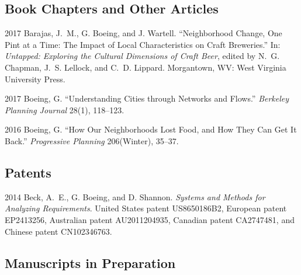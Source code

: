 \documentclass{mycv}
\begin{document}
\subsection*{Book Chapters and Other Articles}

\begin{tablist}

\item[2017] \tab Barajas, J.~M., G. Boeing, and J. Wartell. \enquote{Neighborhood Change, One Pint at a Time: The Impact of Local Characteristics on Craft Breweries.} In: \emph{Untapped: Exploring the Cultural Dimensions of Craft Beer}, edited by N.~G. Chapman, J.~S. Lellock, and C.~D. Lippard. Morgantown, WV: West Virginia University Press.

\item[2017] \tab Boeing, G. \enquote{Understanding Cities through Networks and Flows.} \emph{Berkeley Planning Journal} 28(1), 118--123.

\item[2016] \tab Boeing, G. \enquote{How Our Neighborhoods Lost Food, and How They Can Get It Back.} \emph{Progressive Planning} 206(Winter), 35--37.

\end{tablist}



\subsection*{Patents}

\begin{tablist}

\item[2014] \tab Beck, A.~E., G. Boeing, and D. Shannon. \emph{Systems and Methods for Analyzing Requirements}. United States patent US8650186B2, European patent EP2413256, Australian patent AU2011204935, Canadian patent CA2747481, and Chinese patent CN102346763.

\end{tablist}



\subsection*{Manuscripts in Preparation}
\end{document}
